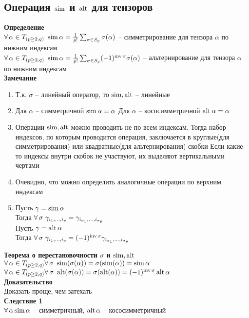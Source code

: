 \documentclass[12pt]{article}
\begin{document}
\subsection{Операция $\operatorname{sim}$ и $\operatorname{alt}$ для тензоров}
\textbf{Определение}\\
$\forall\, \alpha\in T_{(p \geq 2, q)}\ \operatorname{sim} \alpha = \frac1{p!}\sum_{\sigma\in S_p} \sigma(\alpha)$ -- симметрирование для тензора $\alpha$ по нижним индексам\\
$\forall\, \alpha\in T_{(p \geq 2, q)}\ \operatorname{sim} \alpha = \frac1{p!}\sum_{\sigma\in S_p} (-1)^{\operatorname{inv} \sigma}\sigma(\alpha)$ -- альтернирование для тензора $\alpha$ по нижним индексам\\
\textbf{Замечание}
\begin{enumerate}
    \item Т.к. $\sigma$ -- линейный оператор, то $\operatorname{sim}, \operatorname{alt}$ -- линейные
    \item Для $\alpha$ -- симметричной $\operatorname{sim} \alpha = \alpha$
    Для $\alpha$ -- кососимметричной $\operatorname{alt} \alpha = \alpha$
    \item Операции $\operatorname{sim}, \operatorname{alt}$ можно проводить не по всем индексам. Тогда набор индексов, по которым проводится операция, заключается в круглые(для симметрирования) или квадратные(для альтернирования) скобки
    Если какие-то индексы внутри скобок не участвуют, их выделяют вертикальными чертами
    \item Очевидно, что можно определить аналогичные операции по верхним индексам
    \item Пусть $\gamma = \operatorname{sim} \alpha$\\
    Тогда $\forall\, \sigma\ \gamma_{i_1,\ldots, i_p} = \gamma_{i_{\sigma_1},\ldots,i_{\sigma_p}}$\\
    Пусть $\gamma = \operatorname{alt} \alpha$\\
    Тогда $\forall\, \sigma\ \gamma_{i_1,\ldots, i_p} = (-1)^{\operatorname{inv} \sigma}\gamma_{i_{\sigma_1},\ldots,i_{\sigma_p}}$
\end{enumerate}
\textbf{Теорема о перестановочности $\sigma$ и $\operatorname{sim}, \operatorname{alt}$}\\
$\forall\, \alpha \in T_{(p \geq 2,q)} \forall\, \sigma\ \operatorname{sim}(\sigma(\alpha)) = \sigma(\operatorname{sim}(\alpha)) = \operatorname{sim} \alpha$
$\forall\, \alpha \in T_{(p \geq 2,q)} \forall\, \sigma\ \operatorname{alt}(\sigma(\alpha)) = \sigma(\operatorname{alt}(\alpha)) = (-1)^{\operatorname{inv} \sigma}\operatorname{alt} \alpha$\\
\textbf{Доказательство}\\
Доказать проще, чем затехать\\
\textbf{Следствие 1}\\
$\forall\, \alpha \operatorname{sim} \alpha$ -- симметричный, $\operatorname{alt} \alpha$ -- кососимметричный\\
\end{document}
